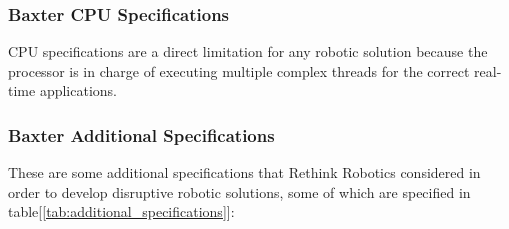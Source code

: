 \documentclass[11pt]{report} %
\begin{document}
\subsubsection{Baxter CPU Specifications}

CPU specifications are a direct limitation for any robotic solution because the processor is in charge of executing multiple complex threads for the correct real-time applications.\\

\begin{table}[H]
\begin{center}
\caption{\label{tab:cpu_specifications} CPU specifications for Baxter robot. Adapted from \citep{cite_baxter_hardware_specifications}.}
\end{center}
\end{table}


\subsubsection{Baxter Additional Specifications}

These are some additional specifications that Rethink Robotics considered in order to develop disruptive robotic solutions, some of which are specified in table[\ref{tab:additional_specifications}]:
\end{document}
